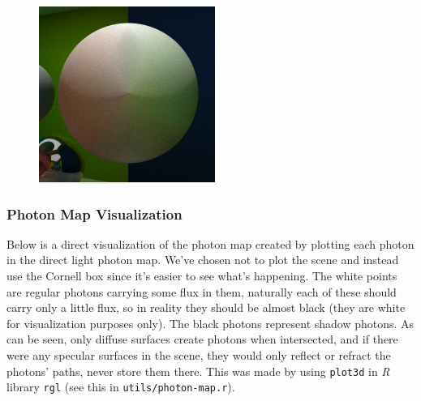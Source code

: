 \documentclass[a4paper, twocolumn]{article}
\begin{document}
            \begin{figure}[H]
                \centering
                \includegraphics[width=0.8\linewidth]{share/new_render_color_bleeding.png}
                \label{fig:render_color_bleeding}
            \end{figure}

            \subsubsection*{Photon Map Visualization}

            Below is a direct visualization of the photon map created by plotting each photon in the direct light photon map. We've chosen not to plot the scene and instead use the Cornell box since it's easier to see what's happening. The white points are regular photons carrying some flux in them, naturally each of these should carry only a little flux, so in reality they should be almost black (they are white for visualization purposes only). The black photons represent shadow photons. As can be seen, only diffuse surfaces create photons when intersected, and if there were any specular surfaces in the scene, they would only reflect or refract the photons' paths, never store them there. This was made by using \texttt{plot3d} in \emph{R} library \texttt{rgl} (see this in \texttt{utils/photon-map.r}).
\end{document}
